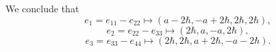 \documentclass[12pt]{amsart}
\begin{document}

We conclude that 
\begin{equation*}
e_{1}=e_{11}-e_{22} \mapsto (a-2\hbar,-a+2\hbar,2\hbar,2\hbar),
\end{equation*}
\begin{equation*}
 e_{2}=e_{22}-e_{33} \mapsto (2\hbar,a,-a,2\hbar),
\end{equation*}
\begin{equation*}
e_{3}=e_{33}-e_{44}  \mapsto (2\hbar,2\hbar,a+2\hbar,-a-2\hbar).
\end{equation*}
\end{document}
